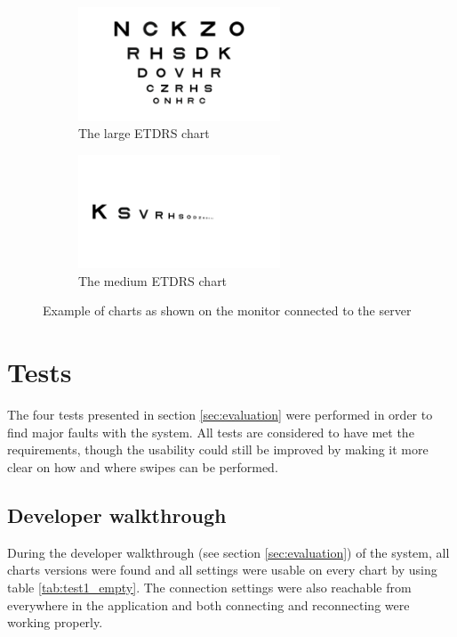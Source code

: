 \documentclass[12pt,a4paper,notitlepage]{report}
\begin{document}
\begin{figure}[ht!]
\centering
\begin{subfigure}{.5\textwidth}
  \centering
  \includegraphics[width=60mm]{images/servergui/etdrs_chart.png}
  \caption{The large ETDRS chart}
  \label{fig:server_large}
\end{subfigure}%
\begin{subfigure}{.5\textwidth}
  \centering
  \includegraphics[width=60mm]{images/servergui/etdrs_single_row.png}
  \caption{The medium ETDRS chart}
  \label{fig:server_medium}
\end{subfigure}
\caption{Example of charts as shown on the monitor connected to the server}
\label{fig:server_charts}
\end{figure}

\section{Tests}
The four tests presented in section \ref{sec:evaluation} were performed in order to find major faults with the system. All tests are considered to have met the requirements, though the usability could still be improved by making it more clear on how and where swipes can be performed.

\subsection{Developer walkthrough}
During the developer walkthrough (see section \ref{sec:evaluation}) of the system, all charts versions were found and all settings were usable on every chart by using table \ref{tab:test1_empty}. The connection settings were also reachable from everywhere in the application and both connecting and reconnecting were working properly.
\end{document}
